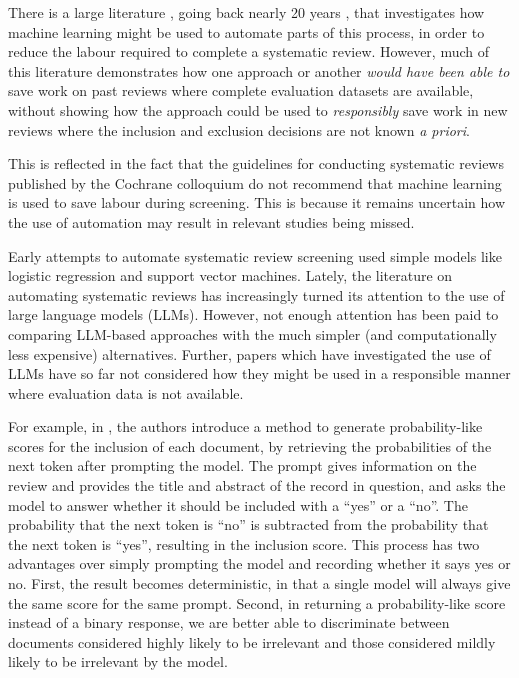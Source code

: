 \documentclass{article}
\begin{document}
	There is a large literature \cite{omara-eves_using_2015}, going back nearly 20 years \cite{cohen_reducing_2006}, that investigates how machine learning might be used to automate parts of this process, in order to reduce the labour required to complete a systematic review. However, much of this literature demonstrates how one approach or another \textit{would have been able to} save work on past reviews where complete evaluation datasets are available, without showing how the approach could be used to \textit{responsibly} save work in new reviews where the inclusion and exclusion decisions are not known \textit{a priori}.
	
	This is reflected in the fact that the guidelines for conducting systematic reviews published by the Cochrane colloquium \cite{lefebvre_chapter_2023} do not recommend that machine learning is used to save labour during screening. This is because it remains uncertain how the use of automation may result in relevant studies being missed.
	
	Early attempts to automate systematic review screening used simple models like logistic regression and support vector machines. Lately, the literature on automating systematic reviews has increasingly turned its attention to the use of large language models (LLMs). However, not enough attention has been paid to comparing LLM-based approaches with the much simpler (and computationally less expensive) alternatives. Further, papers which have investigated the use of LLMs have so far not considered how they might be used in a responsible manner where evaluation data is not available.
	
	For example, in \cite{wang_zero-shot_2024}, the authors introduce a method to generate probability-like scores for the inclusion of each document, by retrieving the probabilities of the next token after prompting the model. The prompt gives information on the review and provides the title and abstract of the record in question, and asks the model to answer whether it should be included with a ``yes'' or a ``no''. The probability that the next token is ``no'' is subtracted from the probability that the next token is ``yes'', resulting in the inclusion score. This process has two advantages over simply prompting the model and recording whether it says yes or no. First, the result becomes deterministic, in that a single model will always give the same score for the same prompt. Second, in returning a probability-like score instead of a binary response, we are better able to discriminate between documents considered highly likely to be irrelevant and those considered mildly likely to be irrelevant by the model.
	
\end{document}
